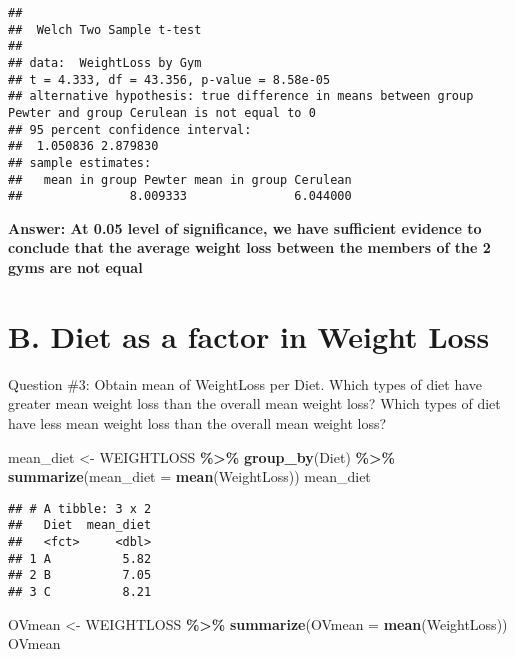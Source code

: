 \documentclass[
]{article}
\newenvironment{Shaded}{\begin{snugshade}}{\end{snugshade}}
\newcommand{\AttributeTok}[1]{\textcolor[rgb]{0.13,0.29,0.53}{#1}}
\newcommand{\FunctionTok}[1]{\textcolor[rgb]{0.13,0.29,0.53}{\textbf{#1}}}
\newcommand{\NormalTok}[1]{#1}
\newcommand{\OtherTok}[1]{\textcolor[rgb]{0.56,0.35,0.01}{#1}}
\newcommand{\SpecialCharTok}[1]{\textcolor[rgb]{0.81,0.36,0.00}{\textbf{#1}}}
\begin{document}
\begin{verbatim}
## 
##  Welch Two Sample t-test
## 
## data:  WeightLoss by Gym
## t = 4.333, df = 43.356, p-value = 8.58e-05
## alternative hypothesis: true difference in means between group Pewter and group Cerulean is not equal to 0
## 95 percent confidence interval:
##  1.050836 2.879830
## sample estimates:
##   mean in group Pewter mean in group Cerulean 
##               8.009333               6.044000
\end{verbatim}

\textbf{Answer: At 0.05 level of significance, we have sufficient
evidence to conclude that the average weight loss between the members of
the 2 gyms are not equal}

\section{B. Diet as a factor in Weight
Loss}\label{b.-diet-as-a-factor-in-weight-loss}

Question \#3: Obtain mean of WeightLoss per Diet. Which types of diet
have greater mean weight loss than the overall mean weight loss? Which
types of diet have less mean weight loss than the overall mean weight
loss?

\begin{Shaded}
\begin{Highlighting}[]
\NormalTok{mean\_diet }\OtherTok{\textless{}{-}}\NormalTok{ WEIGHTLOSS }\SpecialCharTok{\%\textgreater{}\%}
  \FunctionTok{group\_by}\NormalTok{(Diet) }\SpecialCharTok{\%\textgreater{}\%}
  \FunctionTok{summarize}\NormalTok{(}\AttributeTok{mean\_diet =} \FunctionTok{mean}\NormalTok{(WeightLoss))}
\NormalTok{mean\_diet}
\end{Highlighting}
\end{Shaded}

\begin{verbatim}
## # A tibble: 3 x 2
##   Diet  mean_diet
##   <fct>     <dbl>
## 1 A          5.82
## 2 B          7.05
## 3 C          8.21
\end{verbatim}

\begin{Shaded}
\begin{Highlighting}[]
\NormalTok{OVmean }\OtherTok{\textless{}{-}}\NormalTok{ WEIGHTLOSS }\SpecialCharTok{\%\textgreater{}\%} 
          \FunctionTok{summarize}\NormalTok{(}\AttributeTok{OVmean =} \FunctionTok{mean}\NormalTok{(WeightLoss))}
\NormalTok{OVmean}
\end{Highlighting}
\end{Shaded}
\end{document}
